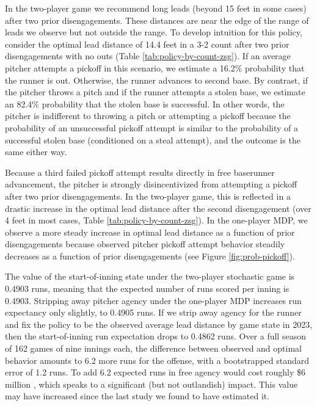 \documentclass[aoas]{imsart}
\begin{document}
    In the two-player game we recommend long leads (beyond 15 feet in some cases) after two prior disengagements. These distances are near the edge of the range of leads we observe but not outside the range. To develop intuition for this policy, consider the optimal lead distance of 14.4 feet in a 3-2 count after two prior disengagements with no outs (Table \ref{tab:policy-by-count-zsg}). If an average pitcher attempts a pickoff in this scenario, we estimate a 16.2\% probability that the runner is out. Otherwise, the runner advances to second base. By contrast, if the pitcher throws a pitch and if the runner attempts a stolen base, we estimate an 82.4\% probability that the stolen base is successful. In other words, the pitcher is indifferent to throwing a pitch or attempting a pickoff because the probability of an unsuccessful pickoff attempt is similar to the probability of a successful stolen base (conditioned on a steal attempt), and the outcome is the same either way.

    Because a third failed pickoff attempt results directly in free baserunner advancement, the pitcher is strongly disincentivized from attempting a pickoff after two prior disengagements. In the two-player game, this is reflected in a drastic increase in the optimal lead distance after the second disengagement (over 4 feet in most cases, Table \ref{tab:policy-by-count-zsg}). In the one-player MDP, we observe a more steady increase in optimal lead distance as a function of prior disengagements because observed pitcher pickoff attempt behavior steadily decreases as a function of prior disengagements (see Figure \ref{fig:prob-pickoff}).

    The value of the start-of-inning state under the two-player stochastic game is 0.4903 runs, meaning that the expected number of runs scored per inning is 0.4903. Stripping away pitcher agency under the one-player MDP increases run expectancy only slightly, to 0.4905 runs. If we strip away agency for the runner and fix the policy to be the observed average lead distance by game state in 2023, then the start-of-inning run expectation drops to 0.4862 runs. Over a full season of 162 games of nine innings each, the difference between observed and optimal behavior amounts to 6.2 more runs for the offense, with a bootstrapped standard error of 1.2 runs. To add 6.2 expected runs in free agency would cost roughly \$6 million \citep{clemens_what_2021}, which speaks to a significant (but not outlandish) impact. This value may have increased since the last study we found to have estimated it.
\end{document}
